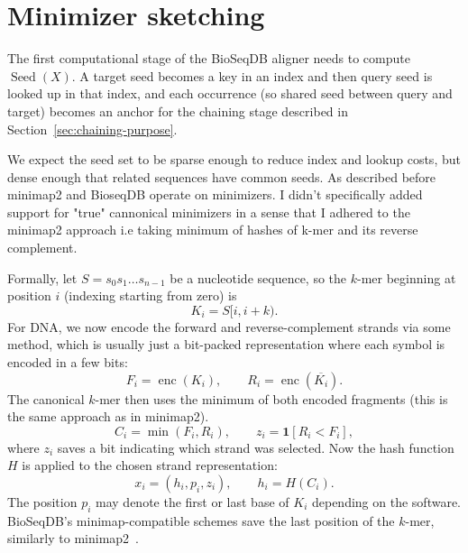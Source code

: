

\raggedbottom

\section{Minimizer sketching}
\label{sec:minimizers-role}

The first computational stage of the BioSeqDB aligner needs to compute
\(\operatorname{Seed}(X)\).
A target seed becomes a key in an index and then query seed is looked
up in that index, and each occurrence (so shared seed between query and target) becomes an anchor for the
chaining stage described in Section~\ref{sec:chaining-purpose}. 

We expect the seed set to be sparse enough to reduce index and lookup costs, but dense enough that related sequences have common seeds.
As described before minimap2 and BioseqDB operate on minimizers. I didn't specifically added support for "true" cannonical minimizers in a sense that I 
adhered to the minimap2 approach i.e taking minimum of hashes of k-mer and its reverse complement.

Formally, let $S=s_0s_1\ldots s_{n-1}$ be a nucleotide sequence, so the $k$-mer beginning
at position $i$ (indexing starting from zero) is
\[
  K_i=S[i,i+k).
\]
For DNA, we now encode the forward and reverse-complement strands via some method, which is usually just a bit-packed representation where each symbol is encoded in a few bits:
\[
  F_i=\operatorname{enc}(K_i),
  \qquad
  R_i=\operatorname{enc}(\overline{K_i}).
\]
The canonical $k$-mer then uses the minimum of both encoded fragments (this is the same approach as in minimap2).
\[
  C_i=\min(F_i,R_i),
  \qquad
  z_i=\mathbf{1}[R_i<F_i],
\]
where $z_i$ saves a bit indicating which strand was selected. Now the hash function $H$ is applied to the chosen strand representation:
\[
  x_i=(h_i,p_i,z_i),
  \qquad
  h_i=H(C_i).
\]
The position $p_i$ may denote the first or last base of $K_i$ depending on the software. BioSeqDB's minimap-compatible schemes save the last position of the $k$-mer, similarly to minimap2~\cite{minimap2_paper}.

